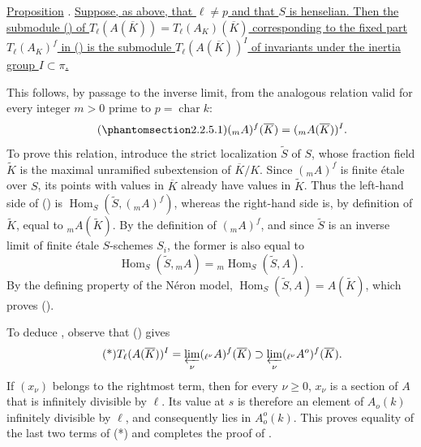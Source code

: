 \medskip
\noindent
\underline{Proposition} . \underline{Suppose, as above, that
$\ell\ne p$ and that $S$ is henselian.  Then the submodule ()
of $T_\ell(A(\overline K))=T_\ell(A_K)(\overline K)$ corresponding to
the fixed part $T_\ell(A_K)^f$ in () is the submodule
$T_\ell(A(\overline K))^I$ of invariants under the inertia group
$I\subset\pi$.}

This follows, by passage to the inverse limit, from the analogous
relation valid for every integer $m>0$ prime to
$p=\operatorname{char}k$:
\begin{equation}\tag{\SGARefTarget{sga7.sga7i.eix.n2-2-5-1}{2.2.5.1}}
 ({}_mA)^f(\overline K)=({}_mA(\overline K))^I.
\end{equation}
To prove this relation, introduce the strict localization $\widetilde S$
of $S$, whose fraction field $\widetilde K$ is the maximal unramified
subextension of $\overline K/K$.  Since $({}_mA)^f$ is finite
\'{e}tale over $S$, its points with values in $\overline K$ already
have values in $\widetilde K$.  Thus the left-hand side of ()
is
$\operatorname{Hom}_S(\widetilde S,({}_mA)^f)$, whereas the right-hand
side is, by definition of $\widetilde K$, equal to ${}_mA(\widetilde K)$.
By the definition of $({}_mA)^f$, and since $\widetilde S$ is an
inverse limit of finite \'{e}tale $S$-schemes $S_i$, the former is also
equal to
\[
 \operatorname{Hom}_S(\widetilde S,{}_mA)
 ={}_m\operatorname{Hom}_S(\widetilde S,A).
\]
By the defining property of the N\'{e}ron model,
$\operatorname{Hom}_S(\widetilde S,A)=A(\widetilde K)$, which proves
().

To deduce , observe that () gives
\begin{equation}\tag{*}
 T_\ell(A(\overline K))^I
 =\varprojlim_\nu({}_{\ell^\nu}A)^f(\overline K)
 \supset\varprojlim_\nu({}_{\ell^\nu}A^o)^f(\overline K).
\end{equation}
If $(x_\nu)$ belongs to the rightmost term, then for every
$\nu\geq0$, $x_\nu$ is a section of $A$ that is infinitely divisible
by $\ell$.  Its value at $s$ is therefore an element of $A_o(k)$
infinitely divisible by $\ell$, and consequently lies in $A_o^o(k)$.
This proves equality of the last two terms of (*) and completes the
proof of .

